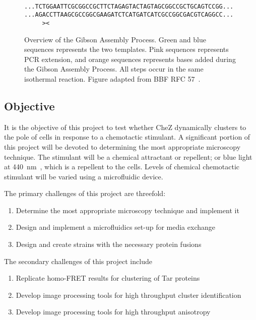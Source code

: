 \documentclass[../main.tex]{subfiles}
\begin{document}
\begin{figure}[p]
{{\\
\texttt{\color{DarkGreen}...TCTGGAATTCGCGGCCGCTTCTAGAG\color{RubineRed}TACTAGTAGCGGCCGC\color{YellowOrange}TGCAGTC\color{DarkBlue}CGG...}
\\
\texttt{\color{DarkGreen}...AGA\color{YellowOrange}CCTTAAG\color{RubineRed}CGCCGGCGAAGATCTC\color{DarkBlue}ATGATCATCGCCGGCGACGTCAGGCC...}
\\
\texttt{\color{black}\ \ \ \ \ ><\ \ \ }
}
\label{fig:gibson:5}
}
\caption[Overview of the Gibson Assembly Process]{Overview of the Gibson Assembly Process. Green and blue sequences  represents the two templates. Pink sequences represents PCR extension, and orange sequences represents bases added during the Gibson Assembly Process. All steps occur in the same isothermal reaction. Figure adapted from BBF RFC 57~\citep{rfc57}.}
\label{fig:gibson}
\end{figure}

\subsection{Objective}
It is the objective of this project to test whether CheZ dynamically clusters to the pole of \ecoli cells in response to a chemotactic stimulant. A significant portion of this project will be devoted to determining the most appropriate microscopy technique. The stimulant will be a chemical attractant or repellent; or blue light at \SI{440}{\nano\meter}~\citep{wright06}, which is a repellent to the cells. Levels of chemical chemotactic stimulant will be varied using a microfluidic device.

The primary challenges of this project are threefold:
\begin{enumerate}
\item Determine the most appropriate microscopy technique and implement it
\item Design and implement a microfluidics set-up for media exchange
\item Design and create \ecoli strains with the necessary protein fusions
\end{enumerate}

The secondary challenges of this project include
\begin{enumerate}
\item Replicate homo-FRET results for clustering of Tar proteins
\item Develop image processing tools for high throughput cluster identification
\item Develop image processing tools for high throughput anisotropy
\end{enumerate}
\end{document}
